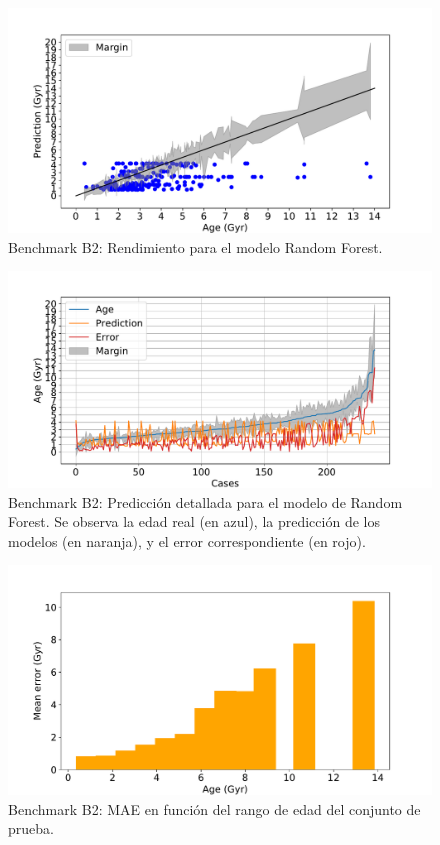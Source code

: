 \begin{figure}[H]
\begin{center}
 \includegraphics[width=0.8\linewidth]{Figuras/Experimentos/B_B2_rf_1.pdf}
\end{center}
\caption{Benchmark B2: Rendimiento para el modelo Random Forest.}
 \label{fig:benchB2_details_rf_1}
\end{figure}

\begin{figure}[H]
\begin{center}
 \includegraphics[width=0.8\linewidth]{Figuras/Experimentos/B_B2_rf_2.pdf}
\end{center}
\caption{Benchmark B2: Predicción detallada para el modelo de Random Forest. Se observa la edad real (en azul), la predicción de los modelos (en naranja), y el error correspondiente (en rojo).}
 \label{fig:benchB2_details_rf_2}
\end{figure}

\begin{figure}[H]
\begin{center}
 \includegraphics[width=0.8\linewidth]{Figuras/Experimentos/B_B2_rf_3.pdf}
\end{center}
\caption{Benchmark B2: MAE en función del rango de edad del conjunto de prueba.}
 \label{fig:benchB2_details_rf_3}
\end{figure}

